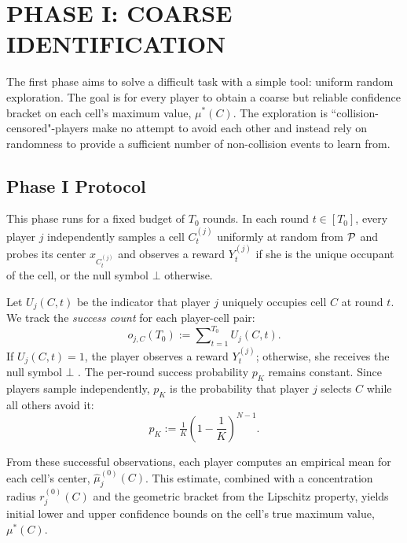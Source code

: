 \section{PHASE I: COARSE IDENTIFICATION}
\label{sec:phase1}

The first phase aims to solve a difficult task with a simple tool: uniform random exploration. The goal is for every player to obtain a coarse but reliable confidence bracket on each cell's maximum value, $\mu^\ast(C)$. The exploration is ``collision-censored"-players make no attempt to avoid each other and instead rely on randomness to provide a sufficient number of non-collision events to learn from.

\subsection{Phase I Protocol}




This phase runs for a fixed budget of $T_0$ rounds. In each round $t \in [T_0]$, every player $j$ independently samples a cell $C_t^{(j)}$ uniformly at random from $\mathcal{P}$ and probes its center $x_{C_t^{(j)}}$ and observes a reward $Y_t^{(j)}$ if she is the unique occupant of the cell, or the null symbol $\bot$ otherwise.

Let $U_j(C,t)$ be the indicator that player $j$ uniquely occupies cell $C$ at round $t$. We track the \emph{success count} for each player-cell pair:
\begin{equation}
\label{eq:success-count}
o_{j,C}(T_0) := \sum\nolimits_{t=1}^{T_0} U_j(C,t).
\end{equation}
If $U_j(C,t)=1$, the player observes a reward $Y_t^{(j)}$; otherwise, she receives the null symbol $\bot$ . The per-round success probability $p_K$ remains constant. Since players sample independently, $p_K$ is the probability that player $j$ selects $C$ while all others avoid it:
\begin{equation}
\label{eq:pk-def}
p_K := \tfrac{1}{K}\left(1-\frac{1}{K}\right)^{N-1}.
\end{equation}




From these successful observations, each player computes an empirical mean for each cell's center, $\widehat{\mu}_{j}^{(0)}(C)$. This estimate, combined with a concentration radius $r^{(0)}_{j}(C)$ and the geometric bracket from the Lipschitz property, yields initial lower and upper confidence bounds on the cell's true maximum value, $\mu^\ast(C)$. 

